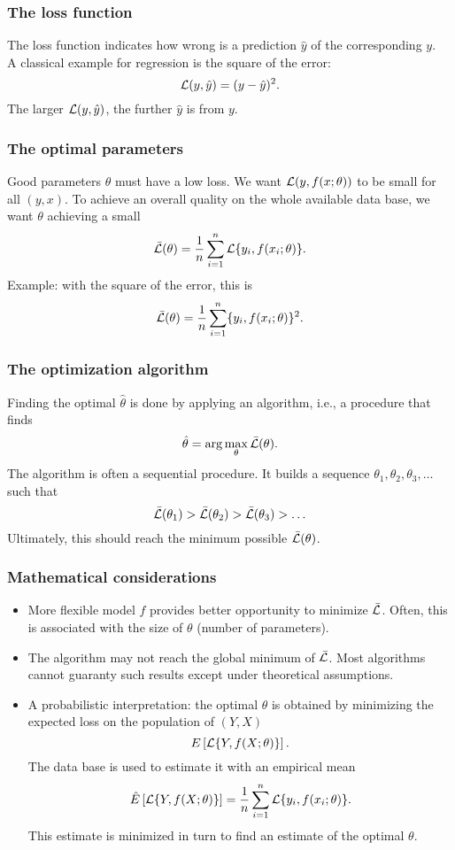 \begin{frame}
\frametitle{The loss function}
The loss function indicates how wrong is a prediction $\hat{y}$ of the corresponding $y$.\\
\vspace{0.3cm} 
A classical example for regression is the square of the error:
$$
{\cal L}(y,\hat{y}) = (y-\hat{y})^2.
$$ 
The larger ${\cal L}(y,\hat{y})$, the further $\hat{y}$ is from $y$.
\end{frame}
\begin{frame}
\frametitle{The optimal parameters}
Good parameters $\theta$ must have a low loss. We want ${\cal L}(y,f(x;\theta))$ to be small for all $(y,x)$. To achieve an overall quality on the whole available data base, we want $\theta$ achieving a small
$$
\bar{{\cal L}}(\theta) = \frac{1}{n}\sum_{i=1}^n {\cal L}\{y_i, f(x_i;\theta)\}.
$$
Example: with the square of the error, this is 
$$
\bar{{\cal L}}(\theta) = \frac{1}{n}\sum_{i=1}^n \{y_i, f(x_i;\theta)\}^2.
$$
\end{frame}
\begin{frame}
\frametitle{The optimization algorithm}
Finding the optimal $\hat{\theta}$ is done by applying an algorithm, i.e., a procedure that finds 
$$
\hat{\theta} = \arg\max_{\theta} \bar{{\cal L}}(\theta).
$$
The algorithm is often a sequential procedure. It builds a sequence $\theta_1, \theta_2, \theta_3, \ldots$ such that
$$
\bar{{\cal L}}(\theta_1) > \bar{{\cal L}}(\theta_2) > \bar{{\cal L}}(\theta_3) > \ldots 
$$
Ultimately, this should reach the minimum possible $\bar{{\cal L}}(\theta)$.
\end{frame}
\begin{frame}
\frametitle{Mathematical considerations}
\small
\begin{itemize}
\item More flexible model $f$ provides better opportunity to minimize $\bar{{\cal L}}$. Often, this is associated with the size of $\theta$ (number of parameters).
\item The algorithm may not reach the global minimum of $\bar{{\cal L}}$. Most algorithms cannot guaranty such results except under theoretical assumptions.
\item A probabilistic interpretation: the optimal $\theta$ is obtained by minimizing the expected loss on the population of $(Y,X)$
$$
E\left[{\cal L}\{Y, f(X;\theta)\}\right].
$$
The data base is used to estimate it with an empirical mean
$$
\hat{E}\left[{\cal L}\{Y, f(X;\theta)\}\right] = \frac{1}{n}\sum_{i=1}^n {\cal L}\{y_i, f(x_i;\theta)\}.
$$
This estimate is minimized in turn to find an estimate of the optimal $\theta$.
\end{itemize}
\normalsize
\end{frame}


